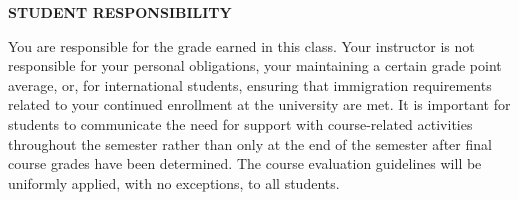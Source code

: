 \documentclass[12pt]{letter}
\begin{document}
\textbf{STUDENT RESPONSIBILITY} \par
You are responsible for the grade earned in this class. Your instructor is not responsible for your personal obligations, your maintaining a certain grade point average, or, for international students, ensuring that immigration requirements related to your continued enrollment at the university are met. It is important for students to communicate the need for support with course-related activities throughout the semester rather than only at the end of the semester after final course grades have been determined.  The course evaluation guidelines will be uniformly applied, with no exceptions, to all students.
\end{document}
